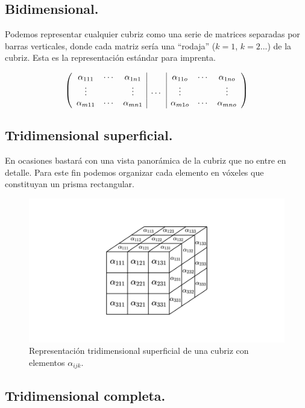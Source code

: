 \documentclass[a4paper, titlepage]{article}
\begin{document}
\subsection{Bidimensional.}

Podemos representar cualquier cubriz como una serie de matrices separadas por barras verticales, donde cada matriz sería una ``rodaja'' ($k=1$, $k=2$...) de la cubriz. Esta es la representación estándar para imprenta.

\[ \left(
\begin{array}{c c c | c | c c c}
	\alpha_{111} & \cdots & \alpha_{1n1} &        & \alpha_{11o} & \cdots & \alpha_{1no} \\
	\vdots       &        & \vdots       & \cdots & \vdots       &        & \vdots       \\
	\alpha_{m11} & \cdots & \alpha_{mn1} &        & \alpha_{m1o} & \cdots & \alpha_{mno} \\
\end{array} \right)
\]

\subsection{Tridimensional superficial.}

En ocasiones bastará con una vista panorámica de la cubriz que no entre en detalle. Para este fin podemos organizar cada elemento en vóxeles que constituyan un prisma rectangular.

\begin{figure}[H]
	\includegraphics[width=\linewidth]{tridimensional_sup.png}
	\caption{Representación tridimensional superficial de una cubriz con elementos $\alpha_{ijk}$.}
\end{figure}

\subsection{Tridimensional completa.}
\end{document}
